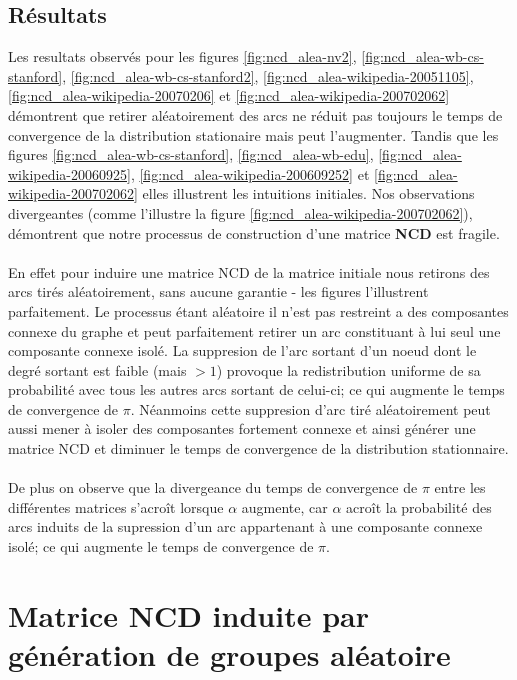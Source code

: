 \documentclass[11pt,oneside,a4paper,french]{article}
\begin{document}
\subsection{Résultats}
Les resultats observés pour les figures \ref{fig:ncd_alea-nv2}, \ref{fig:ncd_alea-wb-cs-stanford}, \ref{fig:ncd_alea-wb-cs-stanford2}, \ref{fig:ncd_alea-wikipedia-20051105}, \ref{fig:ncd_alea-wikipedia-20070206} et \ref{fig:ncd_alea-wikipedia-200702062} démontrent que retirer aléatoirement des arcs ne réduit pas toujours le temps de convergence de la distribution stationaire mais peut l'augmenter. Tandis que les figures \ref{fig:ncd_alea-wb-cs-stanford}, \ref{fig:ncd_alea-wb-edu}, \ref{fig:ncd_alea-wikipedia-20060925}, \ref{fig:ncd_alea-wikipedia-200609252} et \ref{fig:ncd_alea-wikipedia-200702062} elles illustrent les intuitions initiales. Nos observations divergeantes (comme l'illustre la figure \ref{fig:ncd_alea-wikipedia-200702062}), démontrent que notre processus de construction d'une matrice \textbf{NCD} est fragile.\\
\\
En effet pour induire une matrice NCD de la matrice initiale nous retirons des arcs tirés aléatoirement, sans aucune garantie - les figures l'illustrent parfaitement. Le processus étant aléatoire il n'est pas restreint a des composantes connexe du graphe et peut parfaitement retirer un arc constituant à lui seul une composante connexe isolé. La suppresion de l'arc sortant d'un noeud dont le degré sortant est faible (mais $>1$) provoque la redistribution uniforme de sa probabilité avec tous les autres arcs sortant de celui-ci; ce qui augmente le temps de convergence de $\pi$. Néanmoins cette suppresion d'arc tiré aléatoirement peut aussi mener à isoler des composantes fortement connexe et ainsi générer une matrice NCD et diminuer le temps de convergence de la distribution stationnaire.\\
\\
De plus on observe que la divergeance du temps de convergence de $\pi$ entre les différentes matrices s'acroît lorsque $\alpha$ augmente, car $\alpha$ acroît la probabilité des arcs induits de la supression d'un arc appartenant à une composante connexe isolé; ce qui augmente le temps de convergence de $\pi$.

\newpage
\section{Matrice NCD induite par génération de groupes aléatoire}
\end{document}
